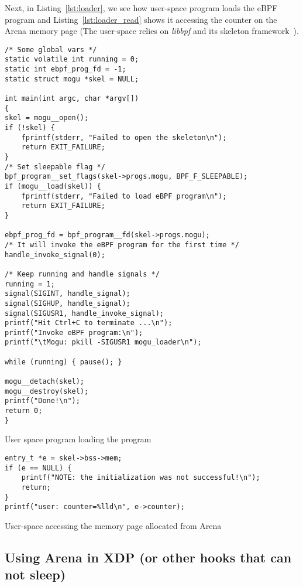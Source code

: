 \documentclass{article} \usepackage{graphicx}
\begin{document}
Next, in Listing~\ref{lst:loader}, we see how user-space program loads the eBPF
program and Listing~\ref{lst:loader_read} shows it accessing the counter on the
Arena memory page (The user-space relies on \emph{libbpf} and its skeleton
framework~\cite{libbpf_skeleton}).

\begin{listing}
\begin{verbatim}
/* Some global vars */
static volatile int running = 0;
static int ebpf_prog_fd = -1;
static struct mogu *skel = NULL;

int main(int argc, char *argv[])
{
skel = mogu__open();
if (!skel) {
    fprintf(stderr, "Failed to open the skeleton\n");
    return EXIT_FAILURE;
}
/* Set sleepable flag */
bpf_program__set_flags(skel->progs.mogu, BPF_F_SLEEPABLE);
if (mogu__load(skel)) {
    fprintf(stderr, "Failed to load eBPF program\n");
    return EXIT_FAILURE;
}

ebpf_prog_fd = bpf_program__fd(skel->progs.mogu);
/* It will invoke the eBPF program for the first time */
handle_invoke_signal(0);

/* Keep running and handle signals */
running = 1;
signal(SIGINT, handle_signal);
signal(SIGHUP, handle_signal);
signal(SIGUSR1, handle_invoke_signal);
printf("Hit Ctrl+C to terminate ...\n");
printf("Invoke eBPF program:\n");
printf("\tMogu: pkill -SIGUSR1 mogu_loader\n");

while (running) { pause(); }

mogu__detach(skel);
mogu__destroy(skel);
printf("Done!\n");
return 0;
}
\end{verbatim}
\caption{User space program loading the program}
\label{lst:loader}
\end{listing}

\begin{listing}
\begin{verbatim}
entry_t *e = skel->bss->mem;
if (e == NULL) {
    printf("NOTE: the initialization was not successful!\n");
    return;
}
printf("user: counter=%lld\n", e->counter);
\end{verbatim}
\caption{User-space accessing the memory page allocated from Arena}
\label{lst:loader_read}
\end{listing}


\subsection{Using Arena in XDP (or other hooks that can not sleep)}
\end{document}
